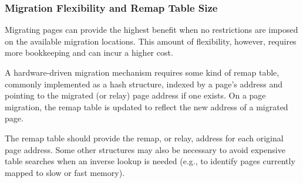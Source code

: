 \subsubsection{Migration Flexibility and Remap Table Size}
\label{sec:relocation}

Migrating pages can provide the highest benefit when no restrictions are imposed on the available migration locations.  This amount of flexibility, however,
requires more bookkeeping and can incur a higher cost.

A hardware-driven migration mechanism requires some kind of remap table,
commonly implemented as a hash structure, indexed by a page's address and pointing to the migrated (or relay) page address if one exists. On a page migration, the remap table is updated to reflect the new address of a migrated page. 

The remap table should provide the remap, or relay, address for each original
page address.  Some other structures may also be necessary to avoid expensive
table searches when an inverse lookup is needed (e.g., to identify pages
currently mapped to slow or fast memory).

